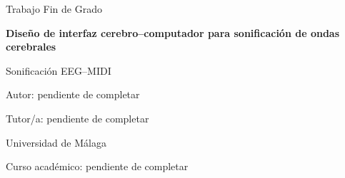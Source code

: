 \documentclass[12pt, a4paper, twoside]{article}
\begin{document}
\begin{titlepage}
    \centering
    \vspace*{2cm}
    {\Large Trabajo Fin de Grado\par}
    \vspace{1.5cm}
    {\Huge\bfseries Diseño de interfaz cerebro--computador para sonificación de ondas cerebrales\par}
    \vspace{1cm}
    {\LARGE Sonificación EEG--MIDI\par}
    \vfill
    {\large Autor: pendiente de completar\par}
    {\large Tutor/a: pendiente de completar\par}
    \vspace{1cm}
    {\large Universidad de Málaga\par}
    {\large Curso académico: pendiente de completar\par}
\end{titlepage}

\newpage
\thispagestyle{empty}
\mbox{}
\newpage

\setcounter{page}{1}


\newpage



\newpage
\thispagestyle{empty}
\mbox{}
\newpage


\newpage

\tableofcontents
\newpage
\listoffigures

\newpage
\thispagestyle{empty}
\mbox{}
\newpage


\newpage


\newpage


\newpage


\newpage


\newpage


\newpage


\newpage



\newpage
\printbibliography

\newpage
\begin{umaappendices}

\end{umaappendices}
\end{document}
